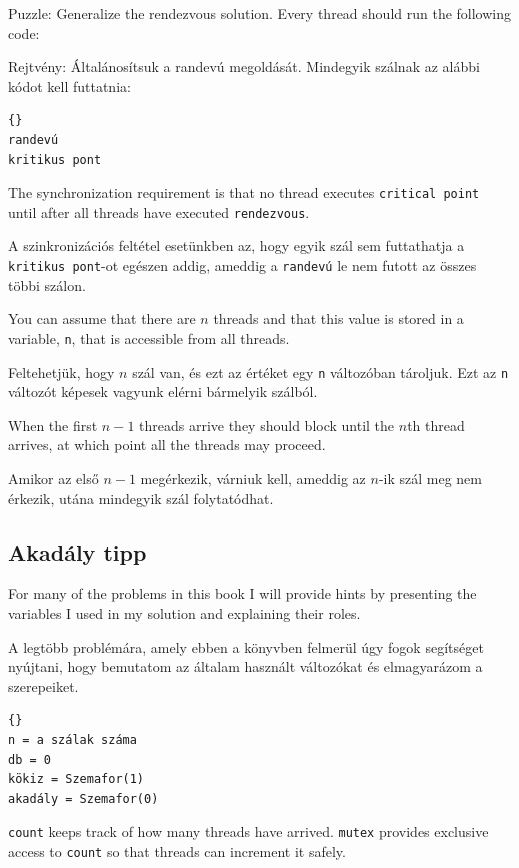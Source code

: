 \documentclass{book}
\newcommand{\clearemptydoublepage}{\newpage\cleardoublepage}
\begin{document}
Puzzle: Generalize the rendezvous solution.  Every thread should
run the following code:

Rejtvény: Általánosítsuk a randevú megoldását. Mindegyik szálnak az alábbi
kódot kell futtatnia:

\begin{lstlisting}[title={Akadály kód}]{}
randevú
kritikus pont
\end{lstlisting}

The synchronization requirement is that
no thread executes {\tt critical point} until after all
threads have executed {\tt rendezvous}.

A szinkronizációs feltétel esetünkben az, hogy egyik szál sem futtathatja a
{\tt kritikus pont}-ot egészen addig, ameddig a {\tt randevú} le nem futott az összes többi szálon.

You can assume that there are $n$
threads and that this value is stored in a variable, {\tt n},
that is accessible from all threads.

Feltehetjük, hogy $n$ szál van, és ezt az értéket egy {\tt n}
változóban tároljuk. Ezt az {\tt n} változót képesek vagyunk elérni bármelyik szálból.

When the first $n-1$ threads arrive they should block until the $n$th
thread arrives, at which point all the threads may proceed.

Amikor az első $n-1$ megérkezik, várniuk kell, ameddig az $n$-ik szál
meg nem érkezik, utána mindegyik szál folytatódhat.

\clearemptydoublepage
\subsection {Akadály tipp}

For many of the problems in this book I will provide hints
by presenting the variables I used in my solution and
explaining their roles.

A legtöbb problémára, amely ebben a könyvben felmerül úgy fogok segítséget nyújtani,
hogy bemutatom az általam használt változókat és elmagyarázom a szerepeiket.

\begin{lstlisting}[title={Akadály tipp}]{}
n = a szálak száma
db = 0
kökiz = Szemafor(1)
akadály = Szemafor(0)
\end{lstlisting}

{\tt count} keeps track of how many threads have arrived.
{\tt mutex} provides exclusive access to {\tt count} so that
threads can increment it safely.
\end{document}
